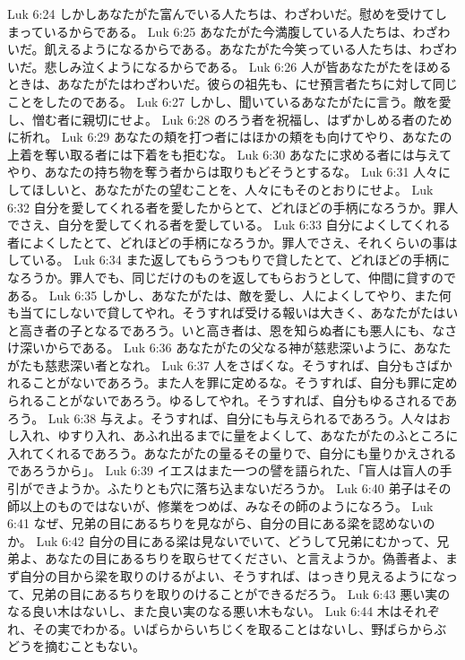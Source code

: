 Luk 6:24  しかしあなたがた富んでいる人たちは、わざわいだ。慰めを受けてしまっているからである。
Luk 6:25  あなたがた今満腹している人たちは、わざわいだ。飢えるようになるからである。あなたがた今笑っている人たちは、わざわいだ。悲しみ泣くようになるからである。
Luk 6:26  人が皆あなたがたをほめるときは、あなたがたはわざわいだ。彼らの祖先も、にせ預言者たちに対して同じことをしたのである。
Luk 6:27  しかし、聞いているあなたがたに言う。敵を愛し、憎む者に親切にせよ。
Luk 6:28  のろう者を祝福し、はずかしめる者のために祈れ。
Luk 6:29  あなたの頬を打つ者にはほかの頬をも向けてやり、あなたの上着を奪い取る者には下着をも拒むな。
Luk 6:30  あなたに求める者には与えてやり、あなたの持ち物を奪う者からは取りもどそうとするな。
Luk 6:31  人々にしてほしいと、あなたがたの望むことを、人々にもそのとおりにせよ。
Luk 6:32  自分を愛してくれる者を愛したからとて、どれほどの手柄になろうか。罪人でさえ、自分を愛してくれる者を愛している。
Luk 6:33  自分によくしてくれる者によくしたとて、どれほどの手柄になろうか。罪人でさえ、それくらいの事はしている。
Luk 6:34  また返してもらうつもりで貸したとて、どれほどの手柄になろうか。罪人でも、同じだけのものを返してもらおうとして、仲間に貸すのである。
Luk 6:35  しかし、あなたがたは、敵を愛し、人によくしてやり、また何も当てにしないで貸してやれ。そうすれば受ける報いは大きく、あなたがたはいと高き者の子となるであろう。いと高き者は、恩を知らぬ者にも悪人にも、なさけ深いからである。
Luk 6:36  あなたがたの父なる神が慈悲深いように、あなたがたも慈悲深い者となれ。
Luk 6:37  人をさばくな。そうすれば、自分もさばかれることがないであろう。また人を罪に定めるな。そうすれば、自分も罪に定められることがないであろう。ゆるしてやれ。そうすれば、自分もゆるされるであろう。
Luk 6:38  与えよ。そうすれば、自分にも与えられるであろう。人々はおし入れ、ゆすり入れ、あふれ出るまでに量をよくして、あなたがたのふところに入れてくれるであろう。あなたがたの量るその量りで、自分にも量りかえされるであろうから」。
Luk 6:39  イエスはまた一つの譬を語られた、「盲人は盲人の手引ができようか。ふたりとも穴に落ち込まないだろうか。
Luk 6:40  弟子はその師以上のものではないが、修業をつめば、みなその師のようになろう。
Luk 6:41  なぜ、兄弟の目にあるちりを見ながら、自分の目にある梁を認めないのか。
Luk 6:42  自分の目にある梁は見ないでいて、どうして兄弟にむかって、兄弟よ、あなたの目にあるちりを取らせてください、と言えようか。偽善者よ、まず自分の目から梁を取りのけるがよい、そうすれば、はっきり見えるようになって、兄弟の目にあるちりを取りのけることができるだろう。
Luk 6:43  悪い実のなる良い木はないし、また良い実のなる悪い木もない。
Luk 6:44  木はそれぞれ、その実でわかる。いばらからいちじくを取ることはないし、野ばらからぶどうを摘むこともない。
